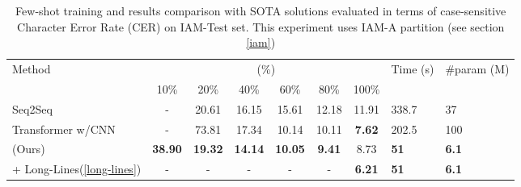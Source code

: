 \documentclass{article}
\begin{document}
\begin{table}
 \caption{Few-shot training and results comparison with SOTA solutions evaluated in terms of case-sensitive Character Error Rate (CER) on IAM-Test set. This experiment uses IAM-A partition (see section \ref{iam})}
  \centering
  \begin{tabular}{l*{6}{c}ll}
    \toprule
    Method & \multicolumn{6}{c}{ (\%)}& Time (s) & \#param (M)\\
    \cmidrule(lr){2-7}
    & \multicolumn{1}{c}{10\%} & \multicolumn{1}{c}{20\%} & 
      \multicolumn{1}{c}{40\%} & \multicolumn{1}{c}{60\%} &
      \multicolumn{1}{c}{80\%} & \multicolumn{1}{c}{100\%} & & \\
      
    \midrule
    Seq2Seq\cite{kang2020pay} & - & 20.61 & 16.15 & 15.61 & 12.18 & 11.91 & 338.7 & 37\\
    Transformer w/CNN\cite{kang2020pay} & - & 73.81 & 17.34 & 10.14 & 10.11 & \textbf{7.62} & 202.5 & 100\\
    \midrule
     (Ours) & \textbf{38.90} & \textbf{19.32} & \textbf{14.14} & \textbf{10.05} & \textbf{9.41} & 8.73 & \textbf{51} & \textbf{6.1}\\
     + Long-Lines(\ref{long-lines}) & - & - & - & - & - & \textbf{6.21} & \textbf{51} & \textbf{6.1}\\
    \bottomrule
  \end{tabular}
  \label{tab:fs_table}
\end{table}
\end{document}
